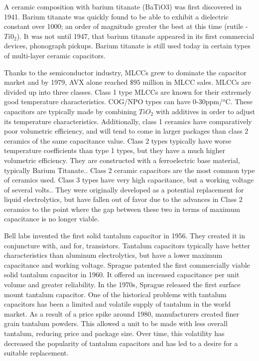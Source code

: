 A ceramic composition with barium titanate (BaTiO3) was first discovered in 1941. Barium titanate was quickly found to be able to exhibit a dielectric constant over 1000; an order of magnitude greater the best at this time (rutile - $Ti0_2$). It was not until 1947, that barium titanate appeared in its first commercial devices, phonograph pickups.\cite{piezCer}\cite{hist_cerFilt}\cite[Ch 3 Sec III]{cerMaterials} Barium titanate is still used today in certain types of multi-layer ceramic capacitors.

Thanks to the semiconductor industry, MLCCs grew to dominate the capacitor market and by 1979, AVX alone reached $\$95$ million in MLCC sales.\cite{avx_hist}
MLCCs are divided up into three classes. Class 1 type MLCCs are known for their extremely good temperature characteristics. COG/NPO types can have 0-30ppm/$^o$C. These capacitors are typically made by combining $TiO_2$ with additives in order to adjust its temperature characteristics\cite{intro_cerCaps}. Additionally, class 1 ceramics have comparatively poor volumetric efficiency, and will tend to come in larger packages than class 2 ceramics of the same capacitance value. Class 2 types typically have worse temperature coefficients than type 1 types, but they have a much higher volumetric efficiency. They are constructed with a ferroelectric base material, typically Barium Titanate.\cite{intro_cerCaps}. Class 2 ceramic capacitors are the most common type of ceramics used. Class 3 types have very high capacitance, but a working voltage of several volts.\cite{hist_cerFilt}\cite[Ch 3 Sec VI]{cerMaterials}\cite{atCer_tempco}. They were originally developed as a potential replacement for liquid electrolytics, but have fallen out of favor due to the advances in Class 2 ceramics to the point where the gap between these two in terms of maximum capacitance is no longer viable\cite{wiki_cer}.

Bell labs invented the first solid tantalum capacitor in 1956. They created it in conjuncture with, and for, transistors.\cite[f.~56-64]{dumInv} Tantalum capacitors typically have better characteristics than aluminum electrolytics, but have a lower maximum capacitance and working voltage.\cite{learn_caps}
Sprague patented the first commercially viable solid tantalum capacitor in 1960. It offered an increased capacitance per unit volume and greater reliability.\cite{charTant} In the 1970s, Sprague released the first surface mount tantalum capacitor.\cite{spragueHist}
One of the historical problems with tantalum capacitors has been a limited and volatile supply of tantalum in the world market. 
As a result of a price spike around 1980, manufacturers created finer grain tantalum powders. This allowed a unit to be made with less overall tantalum, reducing price and package size.\cite[ch~3.1]{tantMis}
Over time, this volatility has decreased the popularity of tantalum capacitors and has led to a desire for a suitable replacement.

